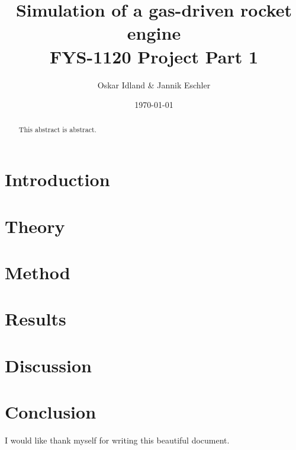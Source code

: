 \documentclass[reprint,english,notitlepage]{revtex4-1}  %
\begin{document}
\author{Oskar Idland \& Jannik Eschler}
\title{%
    \LARGE Simulation of a gas-driven rocket engine\\
    \vspace{1ex}
    \large FYS-1120 Project Part 1}
\date{\today}
\noaffiliation
\begin{abstract}
    This abstract is abstract.
\end{abstract}
\maketitle
\newpage

\section{Introduction}
\section{Theory}   %
\section{Method}
\section{Results}
\section{Discussion}
\section{Conclusion}
\begin{acknowledgments}  %
I would like thank myself for writing this beautiful document.
\end{acknowledgments}
\end{document}
